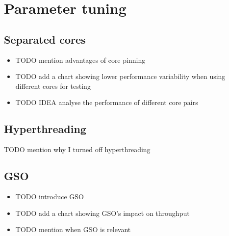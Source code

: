 \documentclass[12pt,a4paper,twoside,openright]{report}
\begin{document}
\section{Parameter tuning}
\subsection{Separated cores}
\begin{itemize}
  \item TODO mention advantages of core pinning
  \item TODO add a chart showing lower performance variability when using different cores for testing 
  \item TODO IDEA analyse the performance of different core pairs 
\end{itemize}

\subsection{Hyperthreading}
TODO mention why I turned off hyperthreading

\subsection{GSO}
\begin{itemize}
  \item TODO introduce GSO
  \item TODO add a chart showing GSO's impact on throughput
  \item TODO mention when GSO is relevant
\end{itemize}
\end{document}
